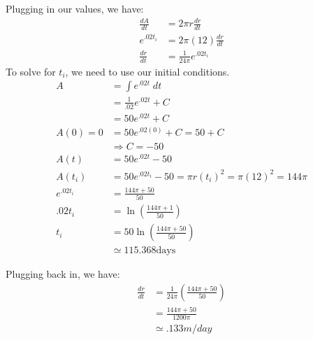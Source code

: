 \documentclass{ximera}
\begin{document}
\begin{exercise}
\begin{hint}
Plugging in our values, we have: \begin{align*}
\frac{dA}{dt} &= 2\pi r \frac{dr}{dt} \\
e^{.02t_i} &= 2\pi (12) \frac{dr}{dt} \\
\frac{dr}{dt} &= \frac{1}{24\pi}e^{.02t_i}
\end{align*} To solve for $t_i$, we need to use our initial
conditions. \begin{align*}
A &= \int e^{.02t}\; dt \\
&= \frac{1}{.02}e^{.02t}+C \\
&= 50e^{.02t}+C \\
A(0) = 0 &= 50e^{.02(0)}+C = 50+C \\
& \Rightarrow C = -50 \\
A(t) &= 50e^{.02t}-50 \\
A(t_i) &= 50e^{.02t_i}-50 = \pi r(t_i)^2 = \pi(12)^2 = 144\pi \\
e^{.02t_i} &= \frac{144\pi+50}{50} \\
.02t_i &= \ln\left(\frac{144\pi+1}{50}\right) \\
t_i &= 50\ln\left(\frac{144\pi+50}{50}\right) \\
&\simeq 115.368 \mbox{days}
\end{align*}

Plugging back in, we have:
\begin{align*}\frac{dr}{dt} &= \frac{1}{24\pi}\left(\frac{144\pi+50}{50}\right) \\
&= \frac{144\pi+50}{1200\pi} \\
& \simeq .133 m/day
\end{align*}
\end{hint}


\begin{multipleChoice}
\end{multipleChoice}

\end{exercise}
\end{document}
